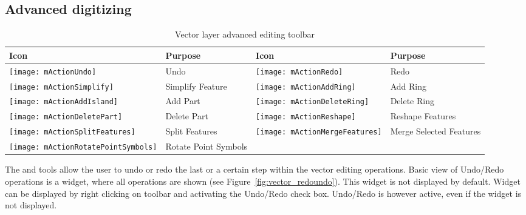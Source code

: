 \subsection{Advanced digitizing}
\label{sec:advanced_edit}

\begin{table}[h]
\centering
\small
\begin{tabular}{|l|p{6.9cm}|l|p{6.9cm}|}
\hline \textbf{Icon} & \textbf{Purpose} & \textbf{Icon} & \textbf{Purpose} \\
\hline \texttt{[image: mActionUndo]}
   & Undo
   & \texttt{[image: mActionRedo]}
   & Redo \\
\hline \texttt{[image: mActionSimplify]}
   & Simplify Feature
   & \texttt{[image: mActionAddRing]}
   & Add Ring \\
\hline \texttt{[image: mActionAddIsland]}
   & Add Part
   & \texttt{[image: mActionDeleteRing]}
   & Delete Ring \\
\hline \texttt{[image: mActionDeletePart]}
   & Delete Part
   & \texttt{[image: mActionReshape]}
   & Reshape Features \\
\hline \texttt{[image: mActionSplitFeatures]}
   & Split Features
   & \texttt{[image: mActionMergeFeatures]}
   & Merge Selected Features \\
\hline \texttt{[image: mActionRotatePointSymbols]}
   & Rotate Point Symbols
   &
   & \\
\hline
\end{tabular}
\caption{Vector layer advanced editing toolbar}\label{tab:advanced_editing}
\end{table}


The  and  tools
allow the user to undo or redo the last or a certain step within the vector editing
operations. Basic view of Undo/Redo operations is a widget, where all operations
are shown (see Figure~\ref{fig:vector_redoundo}). This widget is not displayed by
default. Widget can be displayed by right clicking on toolbar and activating the
Undo/Redo check box. Undo/Redo is however active, even if the widget is not
displayed.

